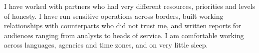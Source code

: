 
I have worked with partners who had very different resources, priorities and levels of honesty. I have run sensitive operations across borders, built working relationships with counterparts who did not trust me, and written reports for audiences ranging from analysts to heads of service. I am comfortable working across languages, agencies and time zones, and on very little sleep.
